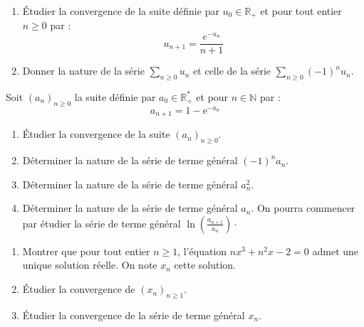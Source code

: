 \documentclass[a4paper,twoside,french,11pt]{VcCours}
\newcommand{\Sum}[2]{\ensuremath{\textstyle{\sum\limits_{#1}^{#2}}}}
\begin{document}
\medskip

\begin{Exercice}  
\begin{enumerate}
\item Étudier la convergence de la suite définie par $u_0 \in \mathbb{R}_+$ et pour tout entier $n \geq 0$ par :
 \[
u_{n + 1} = \frac{e^{ - u_n}}{n + 1}
 \]
\item Donner la nature de la série $\Sum{n \geq 0}{} u_n$ et celle de la série $\Sum{n \geq 0}{} (-1)^n u_n$.
\end{enumerate}
\end{Exercice}



\begin{Exercice} Soit $(a_n )_{n \geq 0} $ la suite définie par $a_0  \in \mathbb{R}^{*}_+$ et pour $n \in \mathbb{N}$ par :
$$a_{n + 1}  = 1 - {\mathrm{e}}^{ - a_n } $$
\begin{enumerate}
	\item Étudier la convergence de la suite $(a_n )_{n \geq 0}$.
	
\item Déterminer la nature de la série de terme général $( - 1)^n a_n.$
	
	\item Déterminer la nature de la série de terme général $a_n^2 $.
	
	\item  Déterminer la nature de la série de terme général $a_n $. On pourra commencer par étudier la série de terme général $\ln \left( {\frac{{a_{n + 1} }}{{a_n }}} \right) \cdot$
\end{enumerate}
\end{Exercice}



\begin{Exercice}[$\bigstar$]
\begin{enumerate}
\item Montrer que pour tout entier $n \geq 1$, l'équation $nx^3+n^2x-2=0$ admet une unique solution réelle. On note $x_n$ cette solution.
\item Étudier la convergence de $(x_n)_{n \geq 1}$.
\item Étudier la convergence de la série de terme général $x_n$.
\end{enumerate}
\end{Exercice}
\end{document}
